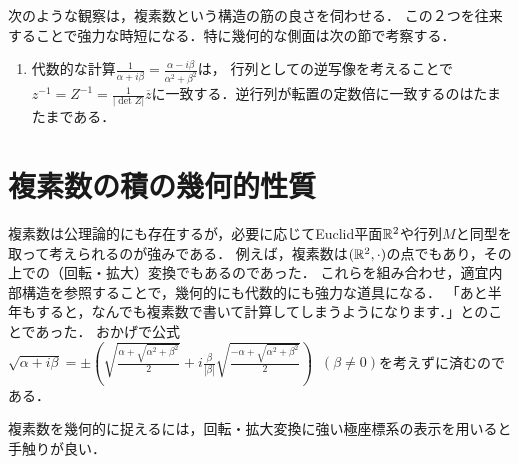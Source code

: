 \documentclass[uplatex, dvipdfmx]{jsreport}
\begin{document}
\begin{remark}[２つの構成の緊密な協調]次のような観察は，複素数という構造の筋の良さを伺わせる．
    この２つを往来することで強力な時短になる．特に幾何的な側面は次の節で考察する．
    \begin{enumerate}
        \item 代数的な計算$\frac{1}{\alpha+i\beta}=\frac{\alpha-i\beta}{\alpha^2+\beta^2}$は，
        行列としての逆写像を考えることで$z^{-1}=Z^{-1}=\frac{1}{|\det Z|}\overline{z}$に一致する．逆行列が転置の定数倍に一致するのはたまたまである．
    \end{enumerate}
\end{remark}

\section{複素数の積の幾何的性質}

\begin{screen}
    複素数は公理論的にも存在するが，必要に応じてEuclid平面$\mathbb{R}^2$や行列$M$と同型を取って考えられるのが強みである．
    例えば，複素数は$(\mathbb{R}^2,\cdot)$の点でもあり，その上での（回転・拡大）変換でもあるのであった．
    これらを組み合わせ，適宜内部構造を参照することで，幾何的にも代数的にも強力な道具になる．
    「あと半年もすると，なんでも複素数で書いて計算してしまうようになります．」とのことであった．
    おかげで公式$\sqrt{\alpha+i\beta}=\pm\left(\sqrt{\frac{\alpha+\sqrt{\alpha^2+\beta^2}}{2}}+i\frac{\beta}{|\beta|}\sqrt{\frac{-\alpha+\sqrt{\alpha^2+\beta^2}}{2}}\right)\;\;(\beta\ne 0)$を考えずに済むのである．
\end{screen}

複素数を幾何的に捉えるには，回転・拡大変換に強い極座標系の表示を用いると手触りが良い．
\end{document}

